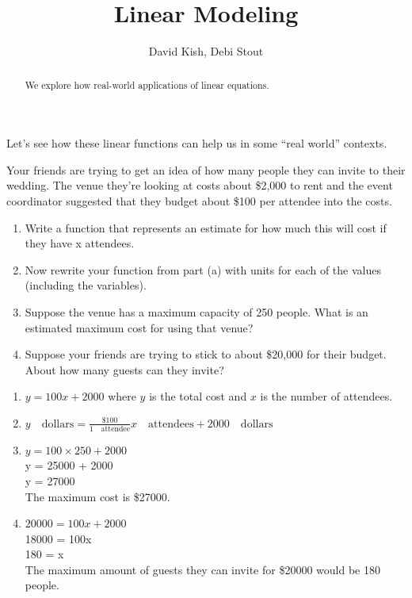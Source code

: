\documentclass{ximera}
\author{David Kish, Debi Stout}
\title{Linear Modeling}
\begin{document}
\begin{abstract}
  We explore how real-world applications of linear equations.
\end{abstract}
\maketitle

Let's see how these linear functions can help us in some ``real world'' contexts.

\begin{example}	
Your friends are trying to get an idea of how many people they can invite to their wedding.  The venue they're looking at costs about \$2,000 to rent and the event coordinator suggested that they budget about \$100 per attendee into the costs.
\begin{enumerate}
\item Write a function that represents an estimate for how much this will cost if they have x attendees.	
\item Now rewrite your function from part (a) with units for each of the values (including the variables).
\item	Suppose the venue has a maximum capacity of 250 people.  What is an estimated maximum cost for using that venue?
\item	Suppose your friends are trying to stick to about \$20,000 for their budget.  About how many guests can they invite?
\end{enumerate}
\begin{explanation}
\begin{enumerate}
\item $y=100x+2000$ where $y$ is the total cost and $x$ is the number of attendees.
\item $y \quad \text{dollars} = \frac{\$100}{1 \quad \text{attendee}} x \quad \text{attendees} + 2000 \quad \text{dollars}$
\item $y = 100 \times 250 + 2000$\\
y = 25000 + 2000\\
y = 27000\\
The maximum cost is \$27000.
\item $20000 = 100x + 2000$\\
18000 = 100x\\
180 = x\\
The maximum amount of guests they can invite for \$20000 would be 180 people.
\end{enumerate}
\end{explanation}
\end{example}
\end{document}
